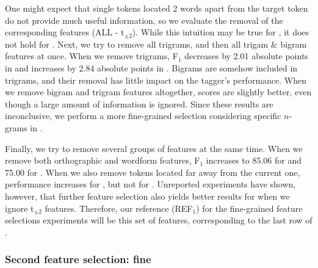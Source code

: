 \documentclass[output=paper,
modfonts
]{langscibook}
\begin{document}
One might expect that single tokens located 2 words apart from the target token do not provide much useful information, so we evaluate the removal of the corresponding features ({\textsc ALL} - {t}$_{\pm 2}$). While this intuition may be true for \devAQ{}, it does not hold for \devDD{}. 
Next, we try to remove all trigrams, and then all trigam \& bigram features at once. When we remove trigrams, F$_1$ decreases by 2.01 absolute points in \devDD{} and increases by 2.84 absolute points in \devAQ{}.
Bigrams are somehow included in trigrams, and their removal has little impact on the tagger's performance. When we remove bigram and trigram features altogether, scores are slightly better, even though a large amount of information is ignored. Since these results are inconclusive, we perform a more fine-grained selection considering specific $n$-grams in . %
 
Finally, we try to remove several groups of features at the same time. When we remove both orthographic and wordform features, F$_1$ increases to 85.06 for \devAQ{} and 75.00 for \devDD{}. When we also remove tokens located far away from the current one, performance increases for \devDD{}, but not for \devAQ{}. Unreported experiments have shown, however, that further feature selection %
also yields better results for \devAQ{} when we ignore t$_{\pm 2}$ features. Therefore, our reference ({\textsc REF$_1$}) for the fine-grained feature selections experiments will be this set of features, corresponding to the last row of .


\subsubsection{Second feature selection: fine}
\label{subsec:results-ambig-feat-fine}
\end{document}
